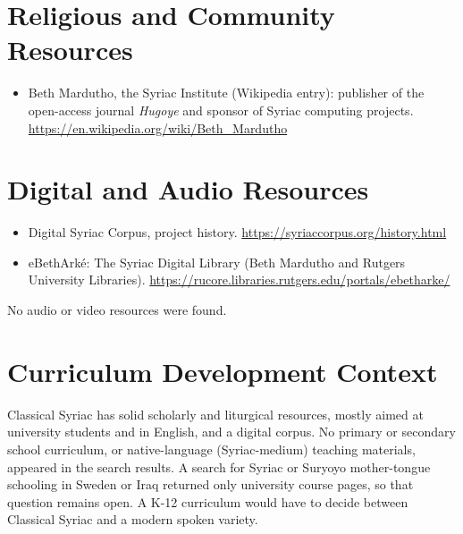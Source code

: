 \documentclass[12pt]{article}
\begin{document}
\section{Religious and Community Resources}
\begin{itemize}
\item Beth Mardutho, the Syriac Institute (Wikipedia entry): publisher of the open-access journal \emph{Hugoye} and sponsor of Syriac computing projects. \url{https://en.wikipedia.org/wiki/Beth_Mardutho}
\end{itemize}

\section{Digital and Audio Resources}
\begin{itemize}
\item Digital Syriac Corpus, project history. \url{https://syriaccorpus.org/history.html}
\item eBethArk\'e: The Syriac Digital Library (Beth Mardutho and Rutgers University Libraries). \url{https://rucore.libraries.rutgers.edu/portals/ebetharke/}
\end{itemize}
No audio or video resources were found.

\section{Curriculum Development Context}
Classical Syriac has solid scholarly and liturgical resources, mostly aimed at university students and in English, and a digital corpus. No primary or secondary school curriculum, or native-language (Syriac-medium) teaching materials, appeared in the search results. A search for Syriac or Suryoyo mother-tongue schooling in Sweden or Iraq returned only university course pages, so that question remains open. A K-12 curriculum would have to decide between Classical Syriac and a modern spoken variety.
\end{document}
